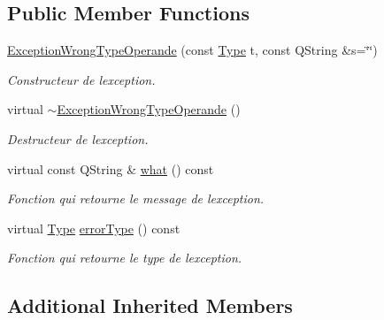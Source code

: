 \subsection*{Public Member Functions}
\begin{DoxyCompactItemize}
\item 
\hyperlink{class_exception_wrong_type_operande_ae978ba3343fb4d38576350c98ece429f}{Exception\+Wrong\+Type\+Operande} (const \hyperlink{class_exception_wrong_type_operande_a1a1fb938febe831c80823eca12a76bd4}{Type} t, const Q\+String \&s=\char`\"{}\char`\"{})
\begin{DoxyCompactList}\small\item\em Constructeur de l\textquotesingle{}exception. \end{DoxyCompactList}\item 
virtual \hyperlink{class_exception_wrong_type_operande_aeb43df3eff16959457f5b1733da85667}{$\sim$\+Exception\+Wrong\+Type\+Operande} ()\hypertarget{class_exception_wrong_type_operande_aeb43df3eff16959457f5b1733da85667}{}\label{class_exception_wrong_type_operande_aeb43df3eff16959457f5b1733da85667}

\begin{DoxyCompactList}\small\item\em Destructeur de l\textquotesingle{}exception. \end{DoxyCompactList}\item 
virtual const Q\+String \& \hyperlink{class_exception_wrong_type_operande_abf65a69fad540f7015838be5576fb55d}{what} () const 
\begin{DoxyCompactList}\small\item\em Fonction qui retourne le message de l\textquotesingle{}exception. \end{DoxyCompactList}\item 
virtual \hyperlink{class_exception_wrong_type_operande_a1a1fb938febe831c80823eca12a76bd4}{Type} \hyperlink{class_exception_wrong_type_operande_abf467a4ec36bf66e7c4d2bb5876dc177}{error\+Type} () const 
\begin{DoxyCompactList}\small\item\em Fonction qui retourne le type de l\textquotesingle{}exception. \end{DoxyCompactList}\end{DoxyCompactItemize}
\subsection*{Additional Inherited Members}



